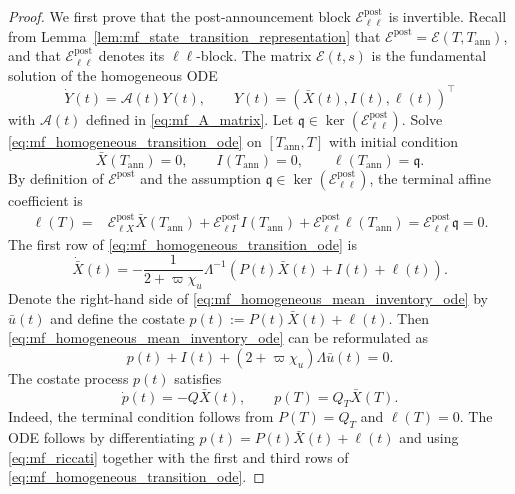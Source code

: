 \documentclass[12pt]{article}
\numberwithin{equation}{section}
\theoremstyle{definition}
\begin{document}
\begin{proof}
We first prove that the post-announcement block
\(\mathcal E^{\mathrm{post}}_{\ell\ell}\) is invertible. Recall from
Lemma~\ref{lem:mf_state_transition_representation} that
\(\mathcal E^{\mathrm{post}}=\mathcal E(T,T_{\mathrm{ann}})\), and that
\(\mathcal E^{\mathrm{post}}_{\ell\ell}\) denotes its \(\ell\ell\)-block. The matrix
\(\mathcal E(t,s)\) is the fundamental solution of the homogeneous ODE
\begin{equation}\label{eq:mf_homogeneous_transition_ode}
\dot{Y}(t)=\mathcal A(t)Y(t),
\qquad
Y(t)=(\bar X(t),I(t),\ell(t))^\top
\end{equation}
with \(\mathcal{A}(t)\) defined in \eqref{eq:mf_A_matrix}.
Let \(\mathfrak q\in\ker(\mathcal E^{\mathrm{post}}_{\ell\ell})\). Solve
\eqref{eq:mf_homogeneous_transition_ode} on
\([T_{\mathrm{ann}},T]\) with initial condition
\[
\bar X(T_{\mathrm{ann}})=0,
\qquad
I(T_{\mathrm{ann}})=0,
\qquad
\ell(T_{\mathrm{ann}})=\mathfrak q.
\]
By definition of \(\mathcal E^{\mathrm{post}}\) and the assumption
\(\mathfrak q\in\ker(\mathcal E^{\mathrm{post}}_{\ell\ell})\), the terminal affine coefficient is
\[
\begin{aligned}
\ell(T)
={}&
\mathcal E^{\mathrm{post}}_{\ell X}\bar X(T_{\mathrm{ann}})
+
\mathcal E^{\mathrm{post}}_{\ell I}I(T_{\mathrm{ann}})
+
\mathcal E^{\mathrm{post}}_{\ell\ell}\ell(T_{\mathrm{ann}})
=\mathcal E^{\mathrm{post}}_{\ell\ell}\mathfrak q
=0.
\end{aligned}
\]
The first row of \eqref{eq:mf_homogeneous_transition_ode} is
\begin{equation}\label{eq:mf_homogeneous_mean_inventory_ode}
\dot{\bar X}(t)
=
-\frac{1}{2+\varpi\chi_u}\Lambda^{-1}
\left(P(t)\bar X(t)+I(t)+\ell(t)\right).
\end{equation}
Denote the right-hand side of
\eqref{eq:mf_homogeneous_mean_inventory_ode} by \(\bar u(t)\) and define the
costate \(p(t):=P(t)\bar X(t)+\ell(t)\). Then
\eqref{eq:mf_homogeneous_mean_inventory_ode} can be reformulated as
\begin{equation}\label{eq:mf_homogeneous_first_row_identity}
p(t)+I(t)+(2+\varpi\chi_u)\Lambda\bar u(t)=0.
\end{equation}
The costate process \(p(t)\) satisfies
\[
\dot p(t)=- Q\bar X(t),
\qquad
p(T)=Q_T\bar X(T).
\]
Indeed, the terminal condition follows from \(P(T)=Q_T\) and \(\ell(T)=0\). The ODE
follows by differentiating \(p(t)=P(t)\bar X(t)+\ell(t)\) and using
\eqref{eq:mf_riccati} together with the first and third rows of
\eqref{eq:mf_homogeneous_transition_ode}.

\end{proof}
\end{document}
